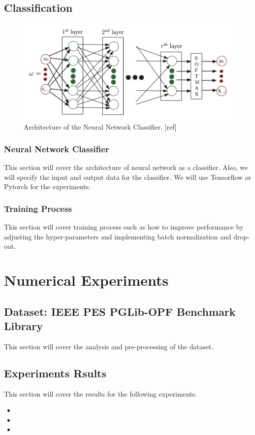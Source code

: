 \documentclass[11pt]{article}
\begin{document}
\subsection{Classification}
\begin{figure}[h]\label{fig:nns_arch}
\centering
\includegraphics[scale=0.31]{report/figure/NNs arch.png}
\caption{Architecture of the Neural Network Classifier. [ref]}
\end{figure}
\subsubsection{Neural Network Classifier}
This section will cover the architecture of neural network as a classifier. Also, we will specify the input and output data for the classifier. We will use Tensorflow or Pytorch for the experiments. 

\subsubsection{Training Process}
This section will cover training process such as how to improve performance by adjusting the hyper-parameters and implementing batch normalization and drop-out.



\section{Numerical Experiments}\label{sec:tests}
\subsection{Dataset:  IEEE PES PGLib-OPF Benchmark Library}
This section will cover the analysis and pre-processing of the dataset.

\subsection{Experiments Rsults}
This section will cover the results for the following experiments.
\begin{itemize}
  \item 
  \item 
  \item
\end{itemize}
\end{document}
